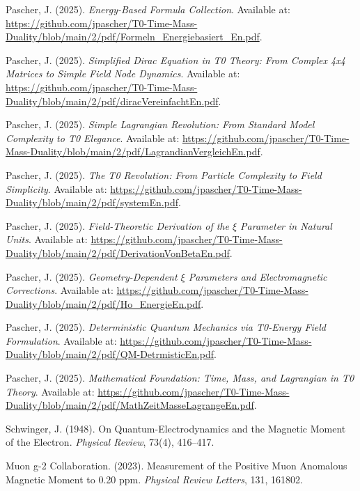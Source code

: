 \documentclass[12pt,a4paper]{article}
\numberwithin{equation}{section}
\begin{document}
\begin{thebibliography}{99}
		Pascher, J. (2025). \emph{Energy-Based Formula Collection}. Available at: \url{https://github.com/jpascher/T0-Time-Mass-Duality/blob/main/2/pdf/Formeln_Energiebasiert_En.pdf}.
		
		Pascher, J. (2025). \emph{Simplified Dirac Equation in T0 Theory: From Complex 4x4 Matrices to Simple Field Node Dynamics}. Available at: \url{https://github.com/jpascher/T0-Time-Mass-Duality/blob/main/2/pdf/diracVereinfachtEn.pdf}.
		
		Pascher, J. (2025). \emph{Simple Lagrangian Revolution: From Standard Model Complexity to T0 Elegance}. Available at: \url{https://github.com/jpascher/T0-Time-Mass-Duality/blob/main/2/pdf/LagrandianVergleichEn.pdf}.
		
		Pascher, J. (2025). \emph{The T0 Revolution: From Particle Complexity to Field Simplicity}. Available at: \url{https://github.com/jpascher/T0-Time-Mass-Duality/blob/main/2/pdf/systemEn.pdf}.
		
		Pascher, J. (2025). \emph{Field-Theoretic Derivation of the $\xi$ Parameter in Natural Units}. Available at: \url{https://github.com/jpascher/T0-Time-Mass-Duality/blob/main/2/pdf/DerivationVonBetaEn.pdf}.
		
		Pascher, J. (2025). \emph{Geometry-Dependent $\xi$ Parameters and Electromagnetic Corrections}. Available at: \url{https://github.com/jpascher/T0-Time-Mass-Duality/blob/main/2/pdf/Ho_EnergieEn.pdf}.
		
		Pascher, J. (2025). \emph{Deterministic Quantum Mechanics via T0-Energy Field Formulation}. Available at: \url{https://github.com/jpascher/T0-Time-Mass-Duality/blob/main/2/pdf/QM-DetrmisticEn.pdf}.
		
		Pascher, J. (2025). \emph{Mathematical Foundation: Time, Mass, and Lagrangian in T0 Theory}. Available at: \url{https://github.com/jpascher/T0-Time-Mass-Duality/blob/main/2/pdf/MathZeitMasseLagrangeEn.pdf}.
		
		Schwinger, J. (1948). On Quantum-Electrodynamics and the Magnetic Moment of the Electron. \emph{Physical Review}, 73(4), 416–417.
		
		Muon g-2 Collaboration. (2023). Measurement of the Positive Muon Anomalous Magnetic Moment to 0.20 ppm. \emph{Physical Review Letters}, 131, 161802.
		

\end{thebibliography}
\end{document}
